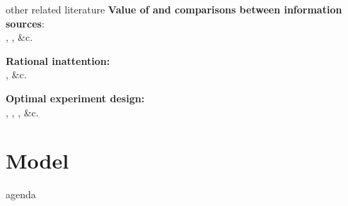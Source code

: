 \documentclass[square,]{gBakerBeamer}
\renewcommand{\|}{\,|\,}
\begin{document}
\begin{frame}{other related literature}
  \textbf{Value of and comparisons between information sources}:\\
  \cite{Borgers2013}, \cite{Athey2018}, \&c.\vspace{\baselineskip}

  \textbf{Rational inattention:}\\
  \cite{Sims2003}, \&c.\vspace{\baselineskip}

  \textbf{Optimal experiment design:}\\
  \cite{Elfving1952}, \cite{Chernoff1953}, \cite{Dette2007}, \&c.\\

\end{frame}



\section{Model}
\label{sec:model}


\begin{frame}{agenda}
  \tableofcontents[currentsection,sectionstyle=show/shaded]
  \note{%

  }
\end{frame}
\end{document}
